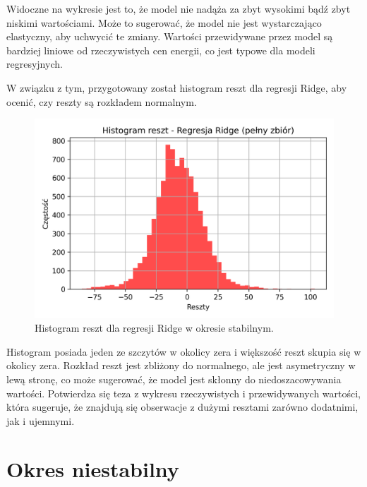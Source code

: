 Widoczne na wykresie jest to, że model nie nadąża za zbyt wysokimi bądź zbyt niskimi wartościami. Może to sugerować, że model nie jest wystarczająco elastyczny, aby uchwycić te zmiany. Wartości przewidywane przez model są bardziej liniowe od rzeczywistych cen energii, co jest typowe dla modeli regresyjnych.

W związku z tym, przygotowany został histogram reszt dla regresji Ridge, aby ocenić, czy reszty są rozkładem normalnym. 

\begin{figure}[H]
    \centering
    \includegraphics[width=1.0\textwidth]{../../plots/predicts/residuals_histogram_Ridge_full_stable_period.png}
    \caption{Histogram reszt dla regresji Ridge w okresie stabilnym.}
    \label{fig:ridge_residuals_full_stable_period}
\end{figure}

Histogram posiada jeden ze szczytów w okolicy zera i większość reszt skupia się w okolicy zera. Rozkład reszt jest zbliżony do normalnego, ale jest asymetryczny w lewą stronę, co może sugerować, że model jest skłonny do niedoszacowywania wartości. Potwierdza się teza z wykresu rzeczywistych i przewidywanych wartości, która sugeruje, że znajdują się obserwacje z dużymi resztami zarówno dodatnimi, jak i ujemnymi.

\section{Okres niestabilny}
\label{sec:okres_niestabilny}
